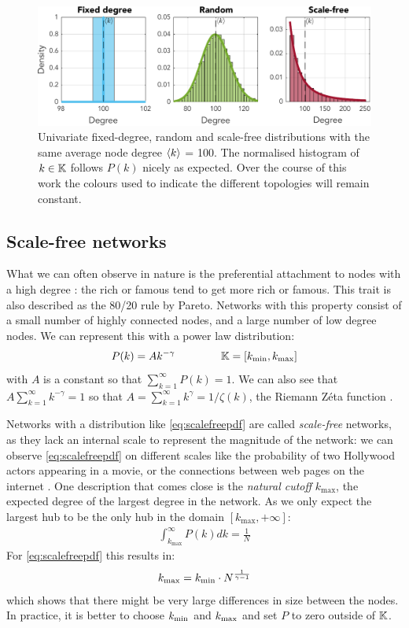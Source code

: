 \begin{figure}[H]
\centering
\includegraphics[width = \textwidth]{../Figures/Distributions/1D.pdf}
\caption{Univariate fixed-degree, random and scale-free distributions with the same average node degree ${\langle k\rangle}$ = 100. The normalised histogram of $k \in {\mathbb{K}}$ follows $P(k)$ nicely as expected. Over the course of this work the colours used to indicate the different topologies will remain constant.}
\label{fig:1Dpdfs}
\end{figure}


\subsection{Scale-free networks}
What we can often observe in nature is the preferential attachment to nodes with a high degree \cite{Bullmore2010}: the rich or famous tend to get more rich or famous. This trait is also described as the 80/20 rule by Pareto. Networks with this property consist of a small number of highly connected nodes, and a large number of low degree nodes. We can represent this with a power law distribution:
\begin{align}
P(k) = A k^{-\gamma} \hspace{15mm} \K = [\kmin, \kmax] \label{eq:scalefreepdf}
\end{align}
with $A$ is a constant so that $\sum_{k=1}^{\infty} P(k) = 1$. We can also see that $A \sum_{k=1}^{\infty} k^{-\gamma} = 1$ so that $A = \sum_{k=1}^{\infty} k^{\gamma} = 1/\zeta(k)$, the Riemann Z{\'e}ta function \cite{BarabasiNetworkBook2016}. 

Networks with a distribution like \eqref{eq:scalefreepdf} are called \textit{scale-free} networks, as they lack an internal scale to represent the magnitude of the network: we can observe \eqref{eq:scalefreepdf} on different scales like the probability of two Hollywood actors appearing in a movie, or the connections between web pages on the internet \cite{Barabasi2003}. One description that comes close is the \textit{natural cutoff} $k_{\text{max}}$, the expected degree of the largest degree in the network. As we only expect the largest hub to be the only hub in the domain $[k_{\text{max}}, +\infty]$:
\begin{align*}
\int_{k_{\text{max}}}^{\infty} P(k) dk=\frac{1}{N}
\end{align*}
For \eqref{eq:scalefreepdf} this results in:
\begin{align}
k_{\text{max}} = k_{\text{min}} \cdot N^{\frac{1}{\gamma-1}} \label{eq:scalefreecutoff}
\end{align}
which shows that there might be very large differences in size between the nodes. In practice, it is better to choose $k_{\text{min}}$ and $k_{\text{max}}$ and set $P$ to zero outside of ${\mathbb{K}}$. \\

